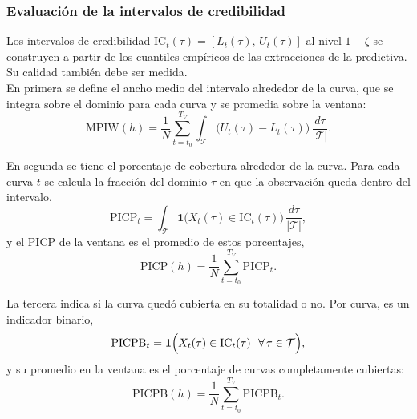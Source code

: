 \subsubsection{Evaluación de la intervalos de credibilidad}
\label{02_02_03_04_calibracion}
Los intervalos de credibilidad $\mathrm{IC}_t(\tau) =[L_t(\tau),\, U_t(\tau)]$ al nivel $1-\zeta$ se construyen a partir de los cuantiles empíricos de las extracciones de la predictiva. Su calidad también debe ser medida.\\

En primera se define  el ancho medio del intervalo alrededor de la curva, que se integra sobre el dominio para cada curva y se promedia sobre la ventana:
\begin{equation}
    \mathrm{MPIW}(h) = \frac{1}{N}\sum_{t=t_0}^{T_V}
    \int_{\mathcal{T}} \bigl(U_t(\tau) - L_t(\tau)\bigr)
    \, \frac{d\tau}{|\mathcal{T}|}.
\end{equation}

En segunda  se tiene  el porcentaje de cobertura alrededor de la curva. Para cada curva $t$ se calcula la fracción del dominio $\tau$ en que la observación queda dentro del intervalo,
\begin{equation}
    \mathrm{PICP}_t = \int_{\mathcal{T}}
    \mathbf{1}\bigl(X_t(\tau) \in \mathrm{IC}_t(\tau)\bigr)
    \, \frac{d\tau}{|\mathcal{T}|},
\end{equation}
y el PICP de la ventana es el promedio de estos porcentajes,
\begin{equation}
    \mathrm{PICP}(h) = \frac{1}{N}\sum_{t=t_0}^{T_V} \mathrm{PICP}_t.
\end{equation}

La tercera indica si la curva quedó cubierta en su totalidad o no. Por curva, es un indicador binario,
\begin{equation}
    \mathrm{PICPB}_t =
    \mathbf{1}\Bigl(X_t(\tau) \in \mathrm{IC}_t(\tau)\ \ \forall\, \tau \in \mathcal{T}\Bigr),
\end{equation}
y su promedio en la ventana es el porcentaje de curvas completamente cubiertas:
\begin{equation}
    \mathrm{PICPB}(h) = \frac{1}{N}\sum_{t=t_0}^{T_V}
    \mathrm{PICPB}_t.
\end{equation}

